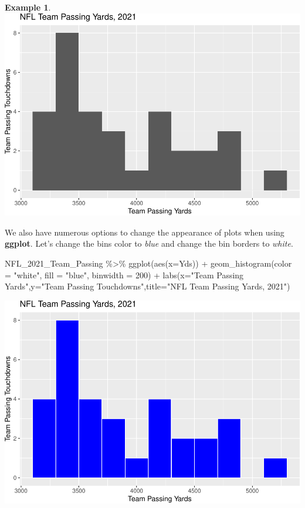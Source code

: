\documentclass[
]{book}
\newenvironment{Shaded}{\begin{snugshade}}{\end{snugshade}}
\newcommand{\AttributeTok}[1]{\textcolor[rgb]{0.77,0.63,0.00}{#1}}
\newcommand{\DecValTok}[1]{\textcolor[rgb]{0.00,0.00,0.81}{#1}}
\newcommand{\FunctionTok}[1]{\textcolor[rgb]{0.00,0.00,0.00}{#1}}
\newcommand{\NormalTok}[1]{#1}
\newcommand{\SpecialCharTok}[1]{\textcolor[rgb]{0.00,0.00,0.00}{#1}}
\newcommand{\StringTok}[1]{\textcolor[rgb]{0.31,0.60,0.02}{#1}}
\theoremstyle{definition}
\theoremstyle{definition}
\newtheorem{example}{Example}[chapter]
\theoremstyle{definition}
\theoremstyle{definition}
\theoremstyle{remark}
\begin{document}
\begin{example}
\includegraphics{series_files/figure-latex/hist2-1.pdf}

We also have numerous options to change the appearance of plots when using \textbf{ggplot}. Let's change the bins color to \emph{blue} and change the bin borders to \emph{white}.

\begin{Shaded}
\begin{Highlighting}[]
\NormalTok{NFL\_2021\_Team\_Passing }\SpecialCharTok{\%\textgreater{}\%} \FunctionTok{ggplot}\NormalTok{(}\FunctionTok{aes}\NormalTok{(}\AttributeTok{x=}\NormalTok{Yds)) }\SpecialCharTok{+} 
  \FunctionTok{geom\_histogram}\NormalTok{(}\AttributeTok{color =} \StringTok{"white"}\NormalTok{, }\AttributeTok{fill =} \StringTok{"blue"}\NormalTok{, }\AttributeTok{binwidth =} \DecValTok{200}\NormalTok{) }\SpecialCharTok{+}
  \FunctionTok{labs}\NormalTok{(}\AttributeTok{x=}\StringTok{"Team Passing Yards"}\NormalTok{,}\AttributeTok{y=}\StringTok{"Team Passing Touchdowns"}\NormalTok{,}\AttributeTok{title=}\StringTok{"NFL Team Passing Yards, 2021"}\NormalTok{)}
\end{Highlighting}
\end{Shaded}

\includegraphics{series_files/figure-latex/hist3-1.pdf}
\end{example}
\end{document}
